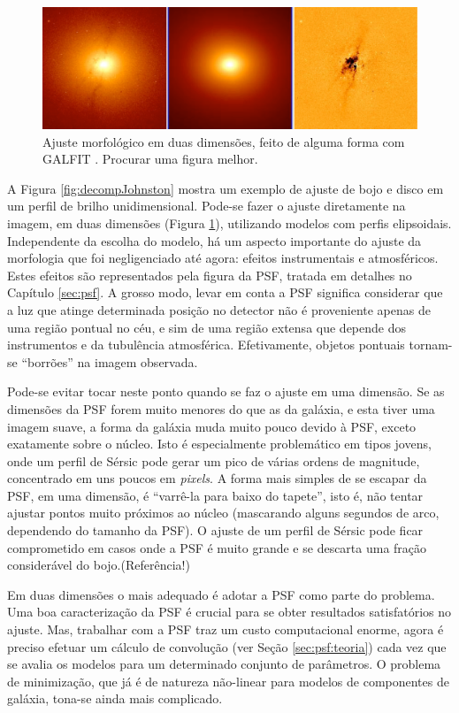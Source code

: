 \begin{figure}
	\includegraphics[width=1.0\textwidth]{figuras/galfit-decomp}
	\caption[Ajuste morfológico em duas dimensões] {\TODO Ajuste morfológico
	em duas dimensões, feito de alguma forma com GALFIT \citep{Peng2002}. Procurar
	uma figura melhor.}
	\label{fig:decompGalfit}
\end{figure}

A Figura \ref{fig:decompJohnston} mostra um exemplo de ajuste de bojo e disco em
um perfil de brilho unidimensional. Pode-se fazer o ajuste diretamente na
imagem, em duas dimensões (Figura \ref{fig:decompGalfit}), utilizando modelos
com perfis elipsoidais. Independente da escolha do modelo, há um aspecto
importante do ajuste da morfologia que foi negligenciado até agora: efeitos
instrumentais e atmosféricos. Estes efeitos são representados pela figura da
PSF, tratada em detalhes no Capítulo \ref{sec:psf}. A grosso modo, levar em
conta a PSF significa considerar que a luz que atinge determinada posição no
detector não é proveniente apenas de uma região pontual no céu, e sim de uma
região extensa que depende dos instrumentos e da tubulência atmosférica.
Efetivamente, objetos pontuais tornam-se ``borrões'' na imagem observada.

Pode-se evitar tocar neste ponto quando se faz o ajuste em uma dimensão.
Se as dimensões da PSF forem muito menores do que as da galáxia, e esta tiver
uma imagem suave, a forma da galáxia muda muito pouco devido à PSF, exceto
exatamente sobre o núcleo. Isto é especialmente problemático em tipos jovens,
onde um perfil de Sérsic pode gerar um pico de várias ordens de magnitude,
concentrado em uns poucos em {\em pixels}. A forma mais simples de se escapar da
PSF, em uma dimensão, é ``varrê-la para baixo do tapete'', isto é, não tentar
ajustar pontos muito próximos ao núcleo (mascarando alguns segundos de arco,
dependendo do tamanho da PSF). O ajuste de um perfil de Sérsic pode ficar
comprometido em casos onde a PSF é muito grande e se descarta uma fração
considerável do bojo.\fixme(Referência!)

Em duas dimensões o mais adequado é adotar a PSF como parte do problema. Uma boa
caracterização da PSF é crucial para se obter resultados satisfatórios no
ajuste. Mas, trabalhar com a PSF traz um custo computacional enorme, agora é
preciso efetuar um cálculo de convolução (ver Seção \ref{sec:psf:teoria}) cada
vez que se avalia os modelos para um determinado conjunto de parâmetros. O
problema de minimização, que já é de natureza não-linear para modelos de
componentes de galáxia, tona-se ainda mais complicado.

